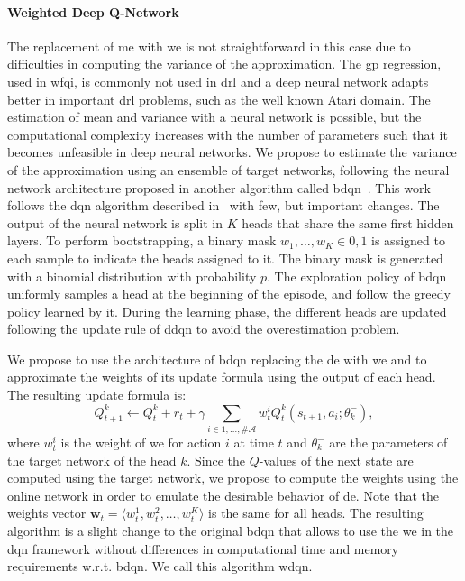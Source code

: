 \paragraph{Weighted Deep Q-Network} The replacement of \gls{me} with \gls{we} is not straightforward in this case due to difficulties in computing the variance of the approximation. The \gls{gp} regression, used in \gls{wfqi}, is commonly not used in \gls{drl} and a deep neural network adapts better in important \gls{drl} problems, such as the well known Atari domain. The estimation of mean and variance with a neural network is possible, but the computational complexity increases with the number of parameters such that it becomes unfeasible in deep neural networks. We propose to estimate the variance of the approximation using an ensemble of target networks, following the neural network architecture proposed in another algorithm called \gls{bdqn}~\cite{osband2017deep}. This work follows the \gls{dqn} algorithm described in~\cite{mnih2015human} with few, but important changes. The output of the neural network is split in $K$ heads that share the same first hidden layers. To perform bootstrapping, a binary mask $w_1, \dots, w_K \in {0,1}$ is assigned to each sample to indicate the heads assigned to it. The binary mask is generated with a binomial distribution with probability $p$. The exploration policy of \gls{bdqn} uniformly samples a head at the beginning of the episode, and follow the greedy policy learned by it. During the learning phase, the different heads are updated following the update rule of \gls{ddqn} to avoid the overestimation problem.

We propose to use the architecture of \gls{bdqn} replacing the \gls{de} with \gls{we} and to approximate the weights of its update formula using the output of each head. The resulting update formula is:
\begin{equation}
Q_{t+1}^k \leftarrow Q_t^k + r_t + \gamma \sum_{i \in {1, \dots, \#\mathcal{A}}} w_t^i Q_t^k(s_{t+1}, a_i; \theta_k^-),
\end{equation}
where $w_t^i$ is the weight of \gls{we} for action $i$ at time $t$ and $\theta_k^-$ are the parameters of the target network of the head $k$. Since the $Q$-values of the next state are computed using the target network, we propose to compute the weights using the online network in order to emulate the desirable behavior of \gls{de}. Note that the weights vector $\mathbf{w}_t = \langle w_t^1, w_t^2, \dots, w_t^K \rangle$ is the same for all heads.
The resulting algorithm is a slight change to the original \gls{bdqn} that allows to use the \gls{we} in the \gls{dqn} framework without differences in computational time and memory requirements w.r.t. \gls{bdqn}. We call this algorithm \gls{wdqn}.

